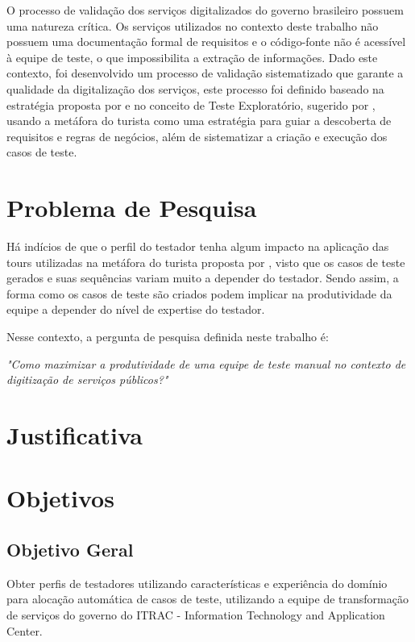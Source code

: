O processo de validação dos serviços digitalizados do governo brasileiro possuem uma natureza crítica. Os serviços utilizados no
contexto deste trabalho não possuem uma documentação formal de requisitos e o código-fonte não é acessível à equipe de teste, o que
impossibilita a extração de informações. Dado este contexto, foi desenvolvido um processo de validação sistematizado que garante
a qualidade da digitalização dos serviços, este processo foi definido baseado na estratégia proposta por \cite{elcock2006testing} e
no conceito de Teste Exploratório, sugerido por \cite{whittaker2009exploratory}, usando a metáfora do turista como uma estratégia
para guiar a descoberta de requisitos e regras de negócios, além de sistematizar a criação e execução dos casos de teste.

\section{Problema de Pesquisa}

Há indícios de que o perfil do testador tenha algum impacto na aplicação das tours utilizadas na metáfora do turista proposta por
\cite{whittaker2009exploratory}, visto que os casos de teste gerados e suas sequências variam muito a depender do testador. Sendo
assim, a forma como os casos de teste são criados podem implicar na produtividade da equipe a depender do nível de expertise do
testador.

Nesse contexto, a pergunta de pesquisa definida neste trabalho é:

\textit{"Como maximizar a produtividade de uma equipe de teste manual no contexto de digitização de serviços públicos?"}

\section{Justificativa}

\section{Objetivos}
\subsection{Objetivo Geral}

Obter perfis de testadores utilizando características e experiência do domínio para alocação automática de casos de teste,
utilizando a equipe de transformação de serviços do governo do ITRAC - Information Technology and Application Center.

